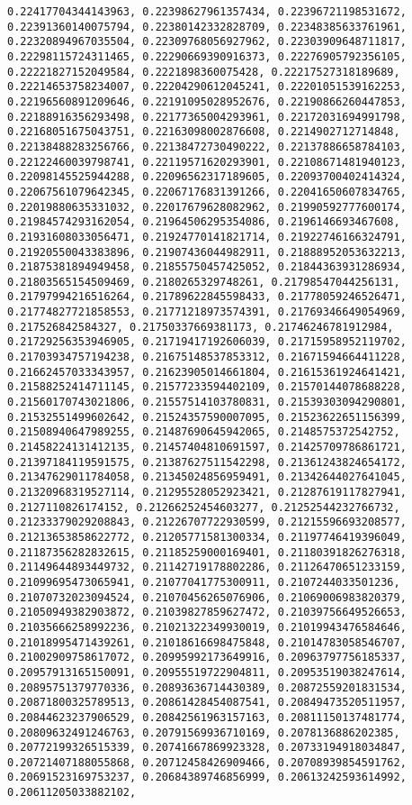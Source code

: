 \documentclass[11pt]{article}
\begin{document}
\begin{Verbatim}[commandchars=\\\{\}]
0.22417704344143963, 0.22398627961357434, 0.22396721198531672, 0.22391360140075794, 0.22380142332828709, 0.22348385633761961, 0.22320894967035504, 0.22309768056927962, 0.22303909648711817, 0.22298115724311465, 0.22290669390916373, 0.22276905792356105, 0.22221827152049584, 0.2221898360075428, 0.22217527318189689, 0.22214653758234007, 0.22204290612045241, 0.22201051539162253, 0.22196560891209646, 0.22191095028952676, 0.22190866260447853, 0.22188916356293498, 0.22177365004293961, 0.22172031694991798, 0.22168051675043751, 0.22163098002876608, 0.2214902712714848, 0.22138488283256766, 0.22138472730490222, 0.22137886658784103, 0.22122460039798741, 0.22119571620293901, 0.22108671481940123, 0.22098145525944288, 0.22096562317189605, 0.22093700402414324, 0.22067561079642345, 0.22067176831391266, 0.22041650607834765, 0.22019880635331032, 0.22017679628082962, 0.21990592777600174, 0.21984574293162054, 0.21964506295354086, 0.2196146693467608, 0.21931608033056471, 0.21924770141821714, 0.21922746166324791, 0.21920550043383896, 0.21907436044982911, 0.21888952053632213, 0.21875381894949458, 0.21855750457425052, 0.21844363931286934, 0.21803565154509469, 0.2180265329748261, 0.21798547044256131, 0.21797994216516264, 0.21789622845598433, 0.21778059246526471, 0.21774827721858553, 0.21771218973574391, 0.21769346649054969, 0.217526842584327, 0.21750337669381173, 0.21746246781912984, 0.21729256353946905, 0.21719417192606039, 0.21715958952119702, 0.21703934757194238, 0.21675148537853312, 0.21671594664411228, 0.21662457033343957, 0.21623905014661804, 0.21615361924641421, 0.21588252414711145, 0.21577233594402109, 0.21570144078688228, 0.21560170743021806, 0.21557514103780831, 0.21539303094290801, 0.21532551499602642, 0.21524357590007095, 0.21523622651156399, 0.21508940647989255, 0.21487690645942065, 0.2148575372542752, 0.21458224131412135, 0.21457404810691597, 0.21425709786861721, 0.21397184119591575, 0.21387627511542298, 0.21361243824654172, 0.21347629011784058, 0.21345024856959491, 0.21342644027641045, 0.21320968319527114, 0.21295528052923421, 0.21287619117827941, 0.2127110826174152, 0.21266252454603277, 0.21252544232766732, 0.21233379029208843, 0.21226707722930599, 0.21215596693208577, 0.21213653858622772, 0.21205771581300334, 0.21197746419396049, 0.21187356282832615, 0.21185259000169401, 0.21180391826276318, 0.21149644893449732, 0.21142719178802286, 0.21126470651233159, 0.21099695473065941, 0.21077041775300911, 0.2107244033501236, 0.21070732023094524, 0.21070456265076906, 0.21069006983820379, 0.21050949382903872, 0.21039827859627472, 0.21039756649526653, 0.21035666258992236, 0.21021322349930019, 0.21019943476584646, 0.21018995471439261, 0.21018616698475848, 0.21014783058546707, 0.21002909758617072, 0.20995992173649916, 0.20963797756185337, 0.20957913165150091, 0.20955519722904811, 0.20953519038247614, 0.20895751379770336, 0.20893636714430389, 0.20872559201831534, 0.20871800325789513, 0.20861428454087541, 0.20849473520511957, 0.20844623237906529, 0.20842561963157163, 0.20811150137481774, 0.20809632491246763, 0.20791569936710169, 0.2078136886202385, 0.20772199326515339, 0.20741667869923328, 0.20733194918034847, 0.20721407188055868, 0.20712458426909466, 0.20708939854591762, 0.20691523169753237, 0.20684389746856999, 0.20613242593614992, 0.20611205033882102, 
\end{Verbatim}
\end{document}
